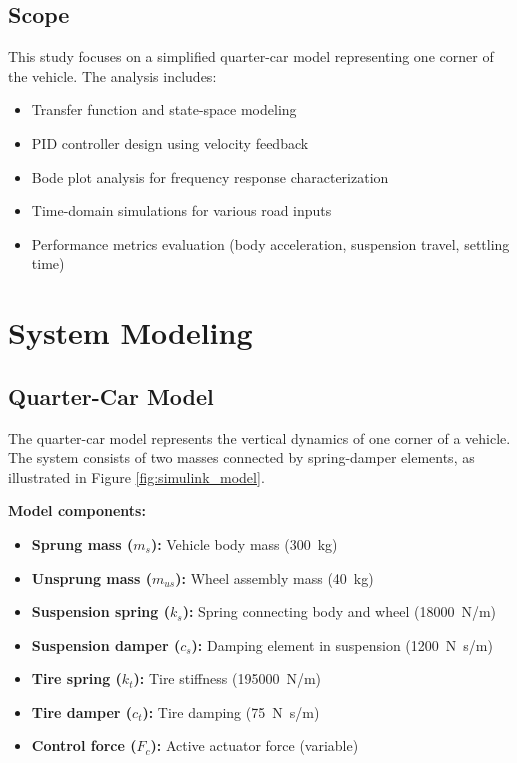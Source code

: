 \documentclass[12pt,a4paper]{article}
\begin{document}
\subsection{Scope}
This study focuses on a simplified quarter-car model representing one corner of the vehicle. The analysis includes:
\begin{itemize}
    \item Transfer function and state-space modeling
    \item PID controller design using velocity feedback
    \item Bode plot analysis for frequency response characterization
    \item Time-domain simulations for various road inputs
    \item Performance metrics evaluation (body acceleration, suspension travel, settling time)
\end{itemize}

\section{System Modeling}

\subsection{Quarter-Car Model}
The quarter-car model represents the vertical dynamics of one corner of a vehicle. The system consists of two masses connected by spring-damper elements, as illustrated in Figure \ref{fig:simulink_model}.

\textbf{Model components:}
\begin{itemize}
    \item \textbf{Sprung mass ($m_s$):} Vehicle body mass (\SI{300}{kg})
    \item \textbf{Unsprung mass ($m_{us}$):} Wheel assembly mass (\SI{40}{kg})
    \item \textbf{Suspension spring ($k_s$):} Spring connecting body and wheel (\SI{18000}{N/m})
    \item \textbf{Suspension damper ($c_s$):} Damping element in suspension (\SI{1200}{N.s/m})
    \item \textbf{Tire spring ($k_t$):} Tire stiffness (\SI{195000}{N/m})
    \item \textbf{Tire damper ($c_t$):} Tire damping (\SI{75}{N.s/m})
    \item \textbf{Control force ($F_c$):} Active actuator force (variable)
\end{itemize}
\end{document}
